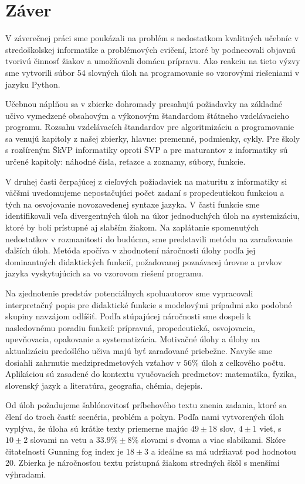 \chapter{Záver}
V záverečnej práci sme poukázali na problém s nedostatkom kvalitných učebníc v stredoškolskej informatike a problémových cvičení, ktoré by podnecovali objavnú tvorivú činnosť žiakov a umožňovali domácu prípravu. Ako reakciu na tieto výzvy sme vytvorili súbor 54 slovných úloh na programovanie so vzorovými riešeniami v jazyku Python.

Učebnou náplňou sa v zbierke dohromady presahujú požiadavky na základné učivo vymedzené obsahovým a výkonovým štandardom štátneho vzdelávacieho programu. Rozsahu vzdelávacích štandardov pre algoritmizáciu a programovanie sa venujú kapitoly z našej zbierky, hlavne: premenné, podmienky, cykly. Pre školy s rozšíreným ŠkVP informatiky oproti ŠVP a pre maturantov z informatiky sú určené kapitoly: náhodné čísla, reťazce a zoznamy, súbory, funkcie.

V druhej časti čerpajúcej z cieľových požiadaviek na maturitu z informatiky si väčšmi uvedomujeme nepostačujúci počet zadaní s propedeutickou funkciou a tých na osvojovanie novozavedenej syntaxe jazyka. V časti funkcie sme identifikovali veľa divergentných úloh na úkor jednoduchých úloh na systemizáciu, ktoré by boli prístupné aj slabším žiakom. Na zaplátanie spomenutých nedostatkov v rozmanitosti do budúcna, sme predstavili metódu na zaraďovanie ďalších úloh. Metóda spočíva v zhodnotení náročnosti úlohy podľa jej dominantných didaktických funkcií, požadovanej poznávacej úrovne a prvkov jazyka vyskytujúcich sa vo vzorovom riešení programu.

Na zjednotenie predstáv potenciálnych spoluautorov sme vypracovali interpretačný popis pre didaktické funkcie s modelovými prípadmi ako podobné skupiny navzájom odlíšiť. Podľa stúpajúcej náročnosti sme dospeli k nasledovnému poradiu funkcií: prípravná, propedeutická, osvojovacia, upevňovacia, opakovanie a systematizácia. Motivačné úlohy a úlohy na aktualizáciu predošlého učiva majú byť zaraďované priebežne. Navyše sme dosiahli zahrnutie medzipredmetových vzťahov v $56 \%$ úloh z celkového počtu. Aplikáciou sú zasadené do kontextu vyučovacích predmetov: matematika, fyzika, slovenský jazyk a literatúra, geografia, chémia, dejepis.

Od úloh požadujeme šablónovitosť príbehového textu znenia zadania, ktoré sa člení do troch častí: scenéria, problém a pokyn. Podľa nami vytvorených úloh vyplýva, že úloha sú krátke texty priemerne majúc $49 \pm 18$ slov, $4 \pm 1$ viet, s $10 \pm 2$ slovami na vetu a $33.9\% \pm 8\%$ slovami s dvoma a viac slabikami. Skóre čitateľnosti Gunning fog index je $18 \pm 3$ a ideálne sa má udržiavať pod hodnotou 20. Zbierka je náročnosťou textu prístupná žiakom stredných škôl s menšími výhradami.

